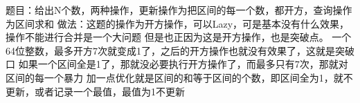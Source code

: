 题目：给出N个数，两种操作，更新操作为把区间的每一个数，都开方，查询操作为区间求和
做法：这题的操作为开方操作，可以Lazy，可是基本没有什么效果，操作不能进行合并是一个大问题
但是也正因为这是开方操作，也是突破点。
一个64位整数，最多开方7次就变成1了，之后的开方操作也就没有效果了，这就是突破口
如果一个区间全是1了，那就没必要执行开方操作了，而最多只有7次，那就对区间的每一个暴力
加一点优化就是区间的和等于区间的个数，即区间全为1，就不更新，或者记录一个最值，最值为1不更新